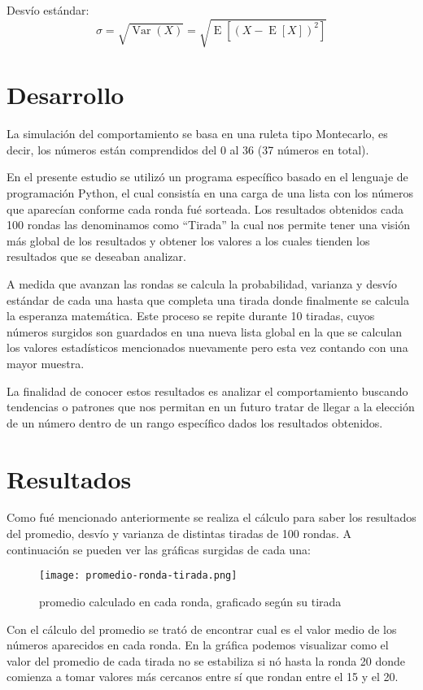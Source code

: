 Desvío estándar:
\begin{equation}
\sigma = \sqrt{\operatorname{Var}(X)} = \sqrt{\operatorname{E}\left[(X - \operatorname{E}[X])^{2}\right]}
\end{equation}

\section{Desarrollo}
La simulación del comportamiento se basa en una ruleta tipo Montecarlo, es decir,  los números están comprendidos del  0 al 36 (37 números en total).

En el presente estudio se utilizó un programa específico basado en el lenguaje de programación Python, el cual consistía en una carga de una lista con los números que aparecían conforme cada ronda fué sorteada. Los resultados obtenidos cada 100 rondas las denominamos como “Tirada” la cual nos permite tener una visión más global de los resultados y obtener los valores a los cuales tienden los resultados que se deseaban analizar.

A medida que avanzan las rondas se calcula la probabilidad, varianza y desvío estándar de cada una hasta que completa una tirada donde finalmente se calcula la esperanza matemática. Este proceso se repite durante 10 tiradas, cuyos números surgidos son guardados en una nueva lista global en la que se calculan los valores estadísticos mencionados nuevamente pero esta vez contando con una mayor muestra.

La finalidad de conocer estos resultados es analizar el comportamiento buscando tendencias o patrones que nos permitan en un futuro tratar de llegar a la elección de un  número dentro de un rango específico dados los resultados obtenidos.

\section{Resultados}
Como fué mencionado anteriormente se realiza el cálculo para saber los resultados del promedio, desvío y varianza de distintas tiradas de 100 rondas. A continuación se pueden ver las gráficas surgidas de cada una:

\begin{minipage}{0.5\textwidth}
  \begin{figure}[H]
  \centering
  \texttt{[image: promedio-ronda-tirada.png]}
  \caption{promedio calculado en cada ronda, graficado según su tirada}
  \label{fig:promedio-ronda-tirada}
  \end{figure}
\end{minipage}%
\begin{minipage}{0.5\textwidth}
Con el cálculo del promedio se trató de encontrar cual es el valor medio de los números aparecidos en cada ronda. En la gráfica podemos visualizar como el valor del promedio de cada tirada no se estabiliza si nó hasta la ronda 20 donde comienza a tomar valores más cercanos entre sí que rondan entre el 15 y el 20.
\end{minipage}

